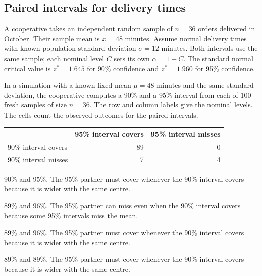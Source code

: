 
\subsection{Paired intervals for delivery times}
\label{prob:c2-4}

A cooperative takes an independent random sample of $n=36$ orders delivered in October. Their sample mean is $\bar{x}=48$ minutes. Assume normal delivery times with known population standard deviation $\sigma=12$ minutes. Both intervals use the same sample; each nominal level $C$ sets its own $\alpha=1-C$. The standard normal critical value is $z^*=1.645$ for 90\% confidence and $z^*=1.960$ for 95\% confidence.

In a simulation with a known fixed mean $\mu=48$ minutes and the same standard deviation, the cooperative computes a 90\% and a 95\% interval from each of 100 fresh samples of size $n=36$. The row and column labels give the nominal levels. The cells count the observed outcomes for the paired intervals.

\begin{center}
\begin{tabular}{@{}lrr@{}}
    \toprule
    & 95\% interval covers & 95\% interval misses \\
    \midrule
    90\% interval covers & 89 & 0 \\
    90\% interval misses & 7 & 4 \\
    \bottomrule
\end{tabular}
\end{center}


\begin{answeroptions}
    \item 90\% and 95\%. The 95\% partner must cover whenever the 90\% interval covers because it is wider with the same centre.
    \item 89\% and 96\%. The 95\% partner can miss even when the 90\% interval covers because some 95\% intervals miss the mean.
    \item 89\% and 96\%. The 95\% partner must cover whenever the 90\% interval covers because it is wider with the same centre.
    \item 89\% and 89\%. The 95\% partner must cover whenever the 90\% interval covers because it is wider with the same centre.
\end{answeroptions}

